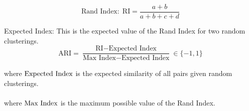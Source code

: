 \documentclass[a4paper,12pt]{article}
\begin{document}
\begin{itemize}
\begin{enumerate}
{			
			
			\[\text{Rand Index:} \ \ \text{RI} = \frac{a + b}{a + b + c + d} \]
			
			Expected Index: This is the expected value of the Rand Index for two random clusterings.\\
			
			\[ \text{ARI} = \frac{\text{RI} - \text{Expected Index}}{\text{Max Index} - \text{Expected Index}} \in \{-1,1\} \] 
			} 
			
			where $\bf \text{Expected Index}$ is the expected similarity of all pairs given random clusterings. \\
			\\
			where $\bf \text{Max Index}$ is the maximum possible value of the Rand Index.
	\end{enumerate}
\end{itemize}
	
	
\end{document}
